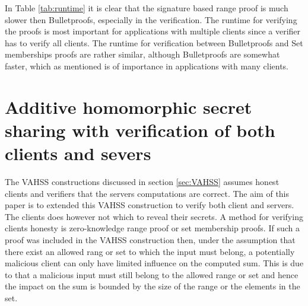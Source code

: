  In Table \ref{tab:runtime} it is clear that the signature based range proof is much slower then Bulletproofs, especially  in the verification. The runtime for verifying the proofs is most important for applications with multiple clients since a verifier has to verify all clients. The runtime for verification between Bulletproofs and Set memberships proofs are rather similar, although Bulletproofs are somewhat faster, which as mentioned is of importance in applications with many clients. 
	
\section{Additive homomorphic secret sharing with verification of both clients and severs }
\label{sec:combination}

The  VAHSS constructions  discussed in section \ref{sec:VAHSS} assumes honest clients and verifiers that the servers computations are correct. The aim of this paper is to extended this VAHSS construction to verify both client and servers. The clients does however not which to reveal their secrets.  A method for verifying clients honesty is zero-knowledge range proof or set membership proofs. If such a proof was included in the VAHSS construction then, under the assumption that there exist an allowed rang or set to which the input must belong, a potentially malicious client can only have limited influence on the computed sum. This is due to that a malicious input must still belong to the allowed range or set and hence the impact on the sum is bounded by the size of the range or the elements in the set. 

